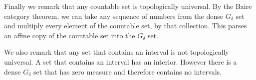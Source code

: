 Finally we remark that any countable set is topologically universal.  By the Baire category theorem, we can take any sequence of numbers from the dense $G_\delta$ set and multiply every element of the countable set, by that collection.  This parses an affine copy of the countable set into the $G_\delta$ set. 
    
We also remark that any set that contains an interval is not topologically universal.  A set that contains an interval has an interior.  However there is a dense $G_\delta$ set that has zero measure and therefore contains no intervals. 